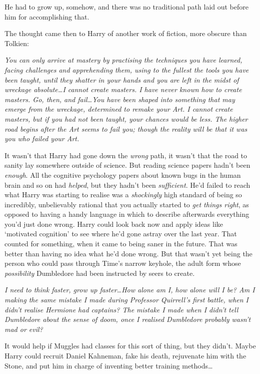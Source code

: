He had to grow up, somehow, and there was no traditional path laid out before him for accomplishing that.

The thought came then to Harry of another work of fiction, more obscure than Tolkien:

\emph{You can only arrive at mastery by practising the techniques you have learned, facing challenges and apprehending them, using to the fullest the tools you have been taught, until they shatter in your hands and you are left in the midst of wreckage absolute…I cannot create masters. I have never known how to create masters. Go, then, and fail…You have been shaped into something that may emerge from the wreckage, determined to remake your Art. I cannot create masters, but if you had not been taught, your chances would be less. The higher road begins after the Art seems to fail you; though the reality will be that it was you who failed your Art.}

It wasn’t that Harry had gone down the \emph{wrong} path, it wasn’t that the road to sanity lay somewhere outside of science. But reading science papers hadn’t been \emph{enough}. All the cognitive psychology papers about known bugs in the human brain and so on had \emph{helped}, but they hadn’t been \emph{sufficient}. He’d failed to reach what Harry was starting to realise was a \emph{shockingly} high standard of being so incredibly, unbelievably rational that you actually started to \emph{get things right}, as opposed to having a handy language in which to describe afterwards everything you’d just done wrong. Harry could look back now and apply ideas like ‘motivated cognition’ to see where he’d gone astray over the last year. That counted for something, when it came to being saner in the future. That was better than having no idea what he’d done wrong. But that wasn’t yet being the person who could pass through Time’s narrow keyhole, the adult form whose \emph{possibility} Dumbledore had been instructed by seers to create.

\emph{I need to think faster, grow up faster…How alone am I, how alone will I be? Am I making the same mistake I made during Professor Quirrell’s first battle, when I didn’t realise Hermione had captains? The mistake I made when I didn’t tell Dumbledore about the sense of doom, once I realised Dumbledore probably wasn’t mad or evil?}

It would help if Muggles had classes for this sort of thing, but they didn’t. Maybe Harry could recruit Daniel Kahneman, fake his death, rejuvenate him with the Stone, and put him in charge of inventing better training methods…


